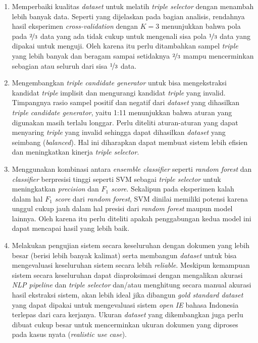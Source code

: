 \begin{enumerate}
	\item Memperbaiki kualitas \textit{dataset} untuk melatih \textit{triple selector} dengan menambah lebih banyak data. Seperti yang dijelaskan pada bagian analisis, rendahnya hasil eksperimen \textit{cross-validation} dengan $K = 3$ menunjukkan bahwa pola pada $\nicefrac{2}{3}$ data yang ada tidak cukup untuk mengenali sisa pola $\nicefrac{1}{3}$ data yang dipakai untuk menguji. Oleh karena itu perlu ditambahkan sampel \textit{triple} yang lebih banyak dan beragam sampai setidaknya $\nicefrac{2}{3}$ mampu mencerminkan sebagian atau seluruh dari sisa $\nicefrac{1}{3}$ data.
	
	\item Mengembangkan \textit{triple candidate generator} untuk bisa mengekstraksi kandidat \textit{triple} implisit dan mengurangi kandidat \textit{triple} yang invalid. Timpangnya rasio sampel positif dan negatif dari \textit{dataset} yang dihasilkan \textit{triple candidate generator}, yaitu 1:11 menunjukkan bahwa aturan yang digunakan masih terlalu longgar. Perlu diteliti aturan-aturan yang dapat menyaring \textit{triple} yang invalid sehingga dapat dihasilkan \textit{dataset} yang seimbang (\textit{balanced}). Hal ini diharapkan dapat membuat sistem lebih efisien dan meningkatkan kinerja \textit{triple selector}.
	
	\item Menggunakan kombinasi antara \textit{ensemble classifier} seperti \textit{random forest} dan \textit{classifier} berpresisi tinggi seperti SVM sebagai \textit{triple selector} untuk meningkatkan \textit{precision} dan \textit{$F_1$ score}. Sekalipun pada eksperimen kalah dalam hal \textit{$F_1$ score} dari \textit{random forest}, SVM dinilai memiliki potensi karena unggul cukup jauh dalam hal presisi dari \textit{random forest} maupun model lainnya. Oleh karena itu perlu diteliti apakah penggabungan kedua model ini dapat mencapai hasil yang lebih baik.
	
	\item Melakukan pengujian sistem secara keseluruhan dengan dokumen yang lebih besar (berisi lebih banyak kalimat) serta membangun \textit{dataset} untuk bisa mengevaluasi keseluruhan sistem secara lebih \textit{reliable}. Meskipun kemampuan sistem secara keseluruhan dapat diaproksimasi dengan mengalikan akurasi \textit{NLP pipeline} dan \textit{triple selector} dan/atau menghitung secara manual akurasi hasil ekstraksi sistem, akan lebih ideal jika dibangun \textit{gold standard dataset} yang dapat dipakai untuk mengevaluasi sistem \textit{open IE} bahasa Indonesia terlepas dari cara kerjanya. Ukuran \textit{dataset} yang dikembangkan juga perlu dibuat cukup besar untuk mencerminkan ukuran dokumen yang diproses pada kasus nyata (\textit{realistic use case}).
	
\end{enumerate}
